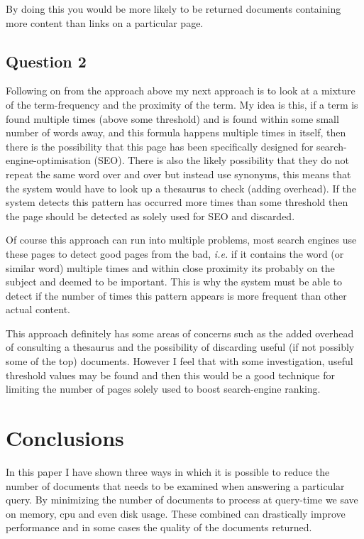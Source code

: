 \documentclass{acm_proc_article-sp}
\begin{document}
By doing this you would be more likely to be returned documents containing more content than links on a particular page.

\subsection{Question 2}

Following on from the approach above my next approach is to look at a mixture of the term-frequency and the proximity of the term. My idea is this, if a term is found multiple times (above some threshold) and is found within some small number of words away, and this formula happens multiple times in itself, then there is the possibility that this page has been specifically designed for search-engine-optimisation (SEO). There is also the likely possibility that they do not repeat the same word over and over but instead use synonyms, this means that the system would have to look up a thesaurus to check (adding overhead). If the system detects this pattern has occurred more times than some threshold then the page should be detected as solely used for SEO and discarded.

Of course this approach can run into multiple problems, most search engines use these pages to detect good pages from the bad, \emph{i.e.} if it contains the word (or similar word) multiple times and within close proximity its probably on the subject and deemed to be important. This is why the system must be able to detect if the number of times this pattern appears is more frequent than other actual content.

This approach definitely has some areas of concerns such as the added overhead of consulting a thesaurus and the possibility of discarding useful (if not possibly some of the top) documents. However I feel that with some investigation, useful threshold values may be found and then this would be a good technique for limiting the number of pages solely used to boost search-engine ranking.

\section{Conclusions}
In this paper I have shown three ways in which it is possible to reduce the number of documents that needs to be examined when answering a particular query. By minimizing the number of documents to process at query-time we save on memory, cpu and even disk usage. These combined can drastically improve performance and in some cases the quality of the documents returned. 
\end{document}
